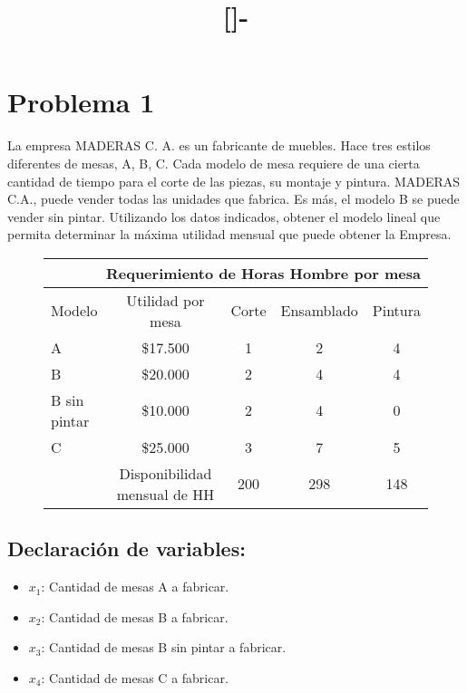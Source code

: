 \documentclass{templateNote}
\begin{document}

\title{[\asignatura]-\titulo}
\author{
    \autor
}
\portada
\margenes %

\section*{Problema 1}

La empresa MADERAS C. A. es un fabricante de muebles. Hace tres estilos diferentes de
mesas, A, B, C. Cada modelo de mesa requiere de una cierta cantidad de tiempo para el corte
de las piezas, su montaje y pintura. MADERAS C.A., puede vender todas las unidades que
fabrica. Es m\'as, el modelo B se puede vender sin pintar. Utilizando los datos indicados,
obtener el modelo lineal que permita determinar la m\'axima utilidad mensual que puede
obtener la Empresa.
\begin{figure}[H]
    \centering
    \begin{tabular}{|l|c|c|c|c|}
        \hline
        \multicolumn{5}{|r|}{Requerimiento de Horas Hombre por mesa} \\ \hline
        Modelo & Utilidad por mesa & Corte & Ensamblado & Pintura \\ \hline
        A & \$17.500 & 1 & 2 & 4 \\
        B & \$20.000 & 2 & 4 & 4 \\
        B sin pintar & \$10.000 & 2 & 4 & 0 \\
        C & \$25.000 & 3 & 7 & 5 \\ \hline
          & Disponibilidad mensual de HH & 200 & 298 & 148 \\ \hline
    \end{tabular}
\end{figure}

\subsection*{Declaraci\'on de variables:}
\begin{itemize}
    \item $x_1$: Cantidad de mesas A a fabricar.
    \item $x_2$: Cantidad de mesas B a fabricar.
    \item $x_3$: Cantidad de mesas B sin pintar a fabricar.
    \item $x_4$: Cantidad de mesas C a fabricar.
\end{itemize}
\end{document}
